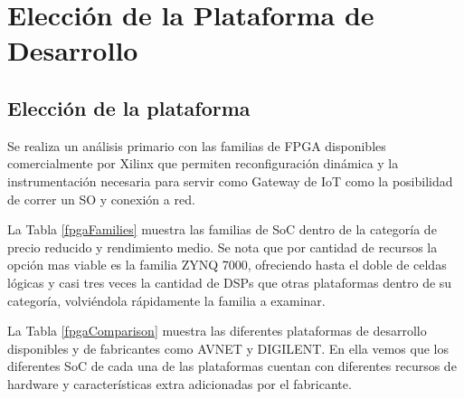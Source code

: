 \chapter{Elección de la Plataforma de Desarrollo} %
\label{Chapter9}

\section{Elección de la plataforma}

Se realiza un análisis primario con las familias de FPGA disponibles comercialmente por Xilinx que permiten reconfiguración dinámica y la instrumentación necesaria para servir como Gateway de IoT como la posibilidad de correr un SO y conexión a red.

La Tabla \ref{fpgaFamilies} muestra las familias de SoC dentro de la categoría de precio reducido y rendimiento medio. Se nota que por cantidad de recursos la opción mas viable es la familia ZYNQ 7000, ofreciendo hasta el doble de celdas lógicas y casi tres veces la cantidad de DSPs que otras plataformas dentro de su categoría, volviéndola rápidamente la familia a examinar.

\begin{table}[!ht]
\centering
{}
\caption{Familias de FPGA}
\label{fpgaFamilies}
\end{table}

La Tabla \ref{fpgaComparison} muestra las diferentes plataformas de desarrollo  disponibles y de fabricantes como AVNET y DIGILENT. En ella vemos que los diferentes SoC de cada una de las plataformas cuentan con diferentes recursos de hardware y características extra adicionadas por el fabricante.

